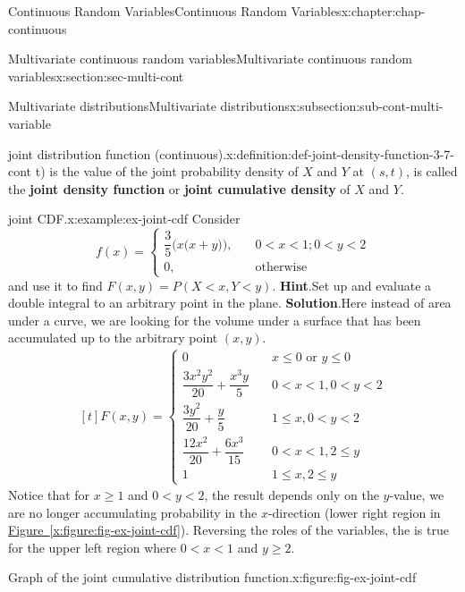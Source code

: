 \documentclass[oneside,10pt,]{book}
\newcommand{\blocktitlefont}{\relax}
\newcommand{\xreffont}{\relax}
\newcommand{\terminology}[1]{\textbf{#1}}
\newcommand{\lt}{<}
\newcommand{\amp}{&}
\begin{document}
\begin{chapterptx}{Continuous Random Variables}{}{Continuous Random Variables}{}{}{x:chapter:chap-continuous}
\begin{sectionptx}{Multivariate continuous random variables}{}{Multivariate continuous random variables}{}{}{x:section:sec-multi-cont}
\begin{subsectionptx}{Multivariate distributions}{}{Multivariate distributions}{}{}{x:subsection:sub-cont-multi-variable}
\begin{definition}{joint distribution function (continuous).}{x:definition:def-joint-density-function-3-7-cont}
t)\) is the value of the joint probability density of \(X\) and \(Y\) at \((s, t)\), is called the \terminology{joint density function} or \terminology{joint cumulative density} of \(X\) and \(Y\).%
\end{definition}
\begin{example}{joint CDF.}{x:example:ex-joint-cdf}%
Consider%
\begin{equation*}
f(x) = \begin{cases}\dfrac{3}{5}\Big(x\Big(x+y\Big)\Big),\amp \quad 0 \lt x \lt 1; 0 \lt y \lt 2\\
0,\amp \quad \text{otherwise}\end{cases}
\end{equation*}
and use it to find \(F(x, y) = P(X \lt x, Y \lt y)\).%
\textbf{\blocktitlefont Hint}.\quad{}Set up and evaluate a double integral to an arbitrary point in the plane.%
\textbf{\blocktitlefont Solution}.\quad{}Here instead of area under a curve, we are looking for the volume under a surface that has been accumulated up to the arbitrary point \((x, y)\).%
\begin{equation*}
\begin{aligned}[t]
F(x,y) = 
\begin{cases}
0 \amp \quad x\le 0\text{ or }y\le 0\\
\dfrac{3x^2y^2}{20} + \dfrac{x^3y}{5} \amp \quad 0 \lt x \lt 1, 0 \lt y \lt 2\\
\dfrac{3y^2}{20}+\dfrac{y}{5} \amp \quad  1\le x, 0 \lt y \lt 2\\
\dfrac{12x^2}{20} +\dfrac{6x^3}{15} \amp \quad 0 \lt x \lt 1, 2\le y\\
1 \amp \quad 1\le x, 2\le y
\end{cases}
\end{aligned}
\end{equation*}
Notice that for \(x \ge 1\) and \(0 \lt y \lt 2\), the result depends only on the \(y\)-value, we are no longer accumulating probability in the \(x\)-direction (lower right region in \hyperref[x:figure:fig-ex-joint-cdf]{Figure~{\xreffont\ref{x:figure:fig-ex-joint-cdf}}}).  Reversing the roles of the variables, the is true for the upper left region where \(0 \lt x \lt 1\) and \(y \ge 2\). \begin{figureptx}{Graph of the joint cumulative distribution function.}{x:figure:fig-ex-joint-cdf}{}%
\begin{image}{0.25}{0.5}{0.25}%

\end{image}
\end{figureptx}
\end{example}
\end{subsectionptx}
\end{sectionptx}
\end{chapterptx}
\end{document}
